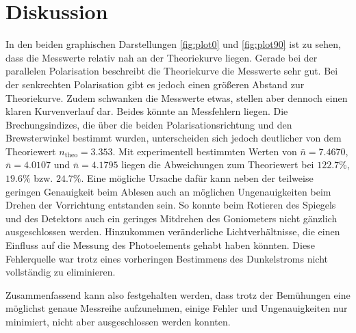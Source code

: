 \section{Diskussion}
\label{sec:Diskussion}

In den beiden graphischen Darstellungen \autoref{fig:plot0} und \autoref{fig:plot90} ist zu sehen, dass die Messwerte relativ nah an der Theoriekurve liegen. Gerade bei der
parallelen Polarisation beschreibt die Theoriekurve die Messwerte sehr gut.  Bei der senkrechten Polarisation gibt es jedoch einen größeren Abstand zur
Theoriekurve. Zudem schwanken die Messwerte etwas, stellen aber dennoch einen klaren Kurvenverlauf dar. Beides könnte an Messfehlern liegen.
Die Brechungsindizes, die über die beiden Polarisationsrichtung und den Brewsterwinkel bestimmt wurden, unterscheiden sich jedoch deutlicher von dem Theoriewert $n_{\text{theo}}=3.353$. Mit
experimentell bestimmten Werten von $\bar{n}=7.4670$, $\bar{n}= 4.0107$ und $\bar{n}= 4.1795$ liegen die Abweichungen zum Theoriewert bei $122.7\%$,  $19.6\%$ bzw. $24.7\%$. Eine mögliche Ursache dafür kann neben der teilweise geringen
Genauigkeit beim Ablesen auch an möglichen Ungenauigkeiten beim Drehen der Vorrichtung entstanden sein. So konnte beim Rotieren des Spiegels und des Detektors auch ein geringes Mitdrehen des Goniometers nicht gänzlich ausgeschlossen werden.
Hinzukommen veränderliche Lichtverhältnisse, die einen Einfluss auf die Messung des Photoelements gehabt haben könnten. Diese Fehlerquelle war trotz eines vorheringen Bestimmens des Dunkelstroms nicht vollständig zu eliminieren.

Zusammenfassend kann also festgehalten werden, dass trotz der Bemühungen eine möglichst genaue Messreihe aufzunehmen, einige Fehler und Ungenauigkeiten nur minimiert, nicht aber ausgeschlossen werden konnten.